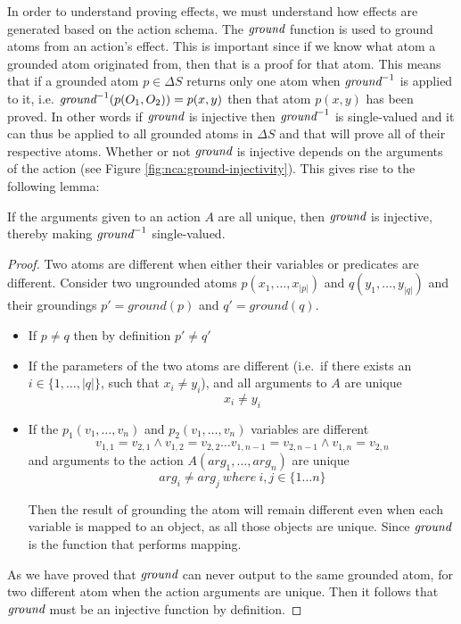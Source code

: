 \documentclass[../Master.tex]{subfiles}
\begin{document}
In order to understand proving effects, we must understand how effects are generated based on the action schema.
The $\textit{ground}$ function is used to ground atoms from an action's effect. This is important since if we know what atom a grounded atom originated from, then that is a proof for that atom. This means that if a grounded atom $p \in \Delta S$ returns only one atom when $\textit{ground} ^{-1}$ is applied to it, i.e. $\textit{ground} ^{-1}(p(O_1,O_2)) = {p(x,y)}$ then that atom $p(x,y)$ has been proved. In other words if $\textit{ground}$ is injective then $\textit{ground} ^{-1}$ is single-valued and it can thus be applied to all grounded atoms in $\Delta S$ and that will prove all of their respective atoms.
Whether or not $\textit{ground}$ is injective depends on the arguments of the action (see Figure \ref*{fig:nca:ground-injectivity}).
This gives rise to the following lemma:
\begin{lemma}
If the arguments given to an action $A$ are all unique, then $\textit{ground}$ is injective, thereby making $\textit{ground} ^{-1}$ single-valued.
\end{lemma}

\begin{proof}
    Two atoms are different when either their variables or predicates are different. Consider two ungrounded atoms $p\left(x_1, \dots, x_{|p|}\right)$ and $q\left(y_1, \dots, y_{|q|}\right)$ and their groundings $p' = ground\left(p \right)$ and $q' = ground\left( q \right)$.
	\begin{itemize}
		\item  If $p \neq q$ then by definition $p' \neq q'$
		
        \item If the parameters of the two atoms are different (i.e.\ if there exists an $i \in \{ 1, \dots, |q| \}$, such that $x_i \neq y_i$), and all arguments to $A$ are unique
            \begin{equation*}
                x_i \neq y_i 
            \end{equation*}
		\item If the $p_1(v_1,\dots,v_n)$ and  $p_2(v_1,\dots,v_n)$ variables are different
			\begin{equation*}
				v_{1,1} = v_{2,1} \land 
				v_{1,2} = v_{2,2} \dots
				v_{1,n-1} = v_{2,n-1} \land
				v_{1,n} = v_{2,n}
			\end{equation*} 		
		and arguments to the action $A(arg_1,\dots,arg_n)$ are unique
			\begin{equation*}
			arg_i \neq arg_j ~ where~ i,j \in \{ 1 \dots n \}
			\end{equation*} 
		 
		Then the result of grounding the atom will remain different even when each variable is mapped to an object, 
		as all those objects are unique. 
		Since $\textit{ground}$ is the function that performs mapping.
	\end{itemize}	
	As we have proved that $\textit{ground}$ can never output to the same grounded atom, for two different atom when the action arguments are unique. Then it follows that $\textit{ground}$ must be an injective function by definition. 
\end{proof}
\end{document}
